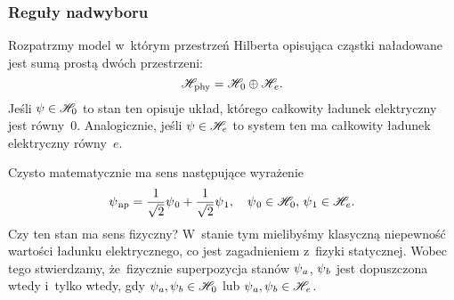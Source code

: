 \documentclass[10pt,t]{beamer}
\begin{document}
\begin{frame}
  \frametitle{Reguły nadwyboru}


  Rozpatrzmy model w~którym przestrzeń Hilberta opisująca cząstki
  naładowane jest sumą prostą dwóch przestrzeni:
  \begin{equation}
    \label{eq:Glowne-rodzaje-problemow-podczerwonych-01}
    \mathcal{H}_{ \hspace{0.07em} \text{phy} } =
    \mathcal{H}_{ \hspace{0.07em} 0 } \oplus \mathcal{H}_{ \hspace{0.07em} e }.
  \end{equation}
  Jeśli $\psi \in \mathcal{H}_{ 0 }$ to stan ten opisuje układ, którego całkowity
  ładunek elektryczny jest równy~$0$. Analogicznie, jeśli
  $\psi \in \mathcal{H}_{ e }$ to system ten ma całkowity ładunek elektryczny
  równy~$e$.

  Czysto matematycznie ma sens następujące wyrażenie
  \begin{equation}
    \label{eq:Glowne-rodzaje-problemow-podczerwonych-02}
    \psi_{ \hspace{0.07em} \text{np} } =
    \frac{ 1 }{ \sqrt{ 2 } } \psi_{ \hspace{0.07em} 0 } +
    \frac{ 1 }{ \sqrt{ 2 } } \psi_{ \hspace{0.07em} 1 }, \quad
    \psi_{ \hspace{0.07em} 0 } \in \mathcal{H}_{ \hspace{0.07em} 0 }, \,
    \psi_{ \hspace{0.07em} 1 } \in \mathcal{H}_{ \hspace{0.07em} e }.
  \end{equation}
  Czy ten stan ma sens fizyczny? W~stanie tym mielibyśmy \alert{klasyczną}
  niepewność wartości ładunku elektrycznego, co jest zagadnieniem z~fizyki
  statycznej. Wobec tego stwierdzamy, że~\alert{fizycznie} superpozycja
  stanów $\psi_{ \hspace{0.05em} a }$, $\psi_{ \hspace{0.05em} b }$ jest dopuszczona wtedy
  i~tylko wtedy,
  gdy $\psi_{ \hspace{0.05em} a }, \psi_{ \hspace{0.05em} b } \in \mathcal{H}_{ \hspace{0.07em} 0 }$
  lub $\psi_{ \hspace{0.05em} a }, \psi_{ \hspace{0.05em} b } \in \mathcal{H}_{ \hspace{0.07em} e }$.

\end{frame}
\end{document}
